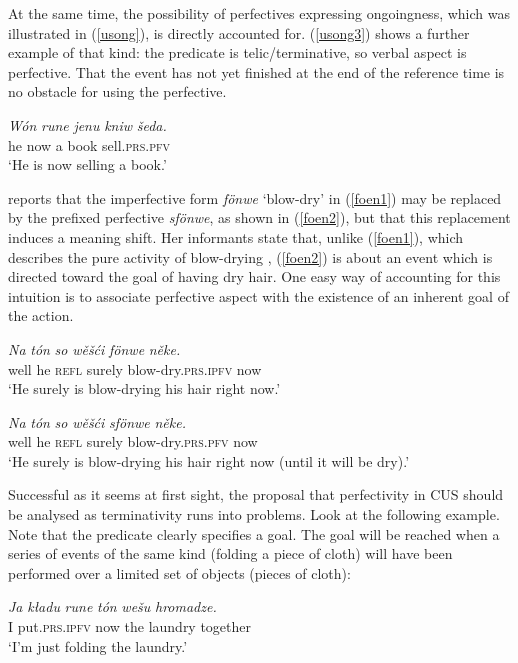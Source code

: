 \documentclass[output=paper,colorlinks,citecolor=brown]{langscibook}
\begin{document}
\noindent At the same time, the possibility of perfectives expressing ongoingness, which was illustrated in (\ref{usong}), is directly accounted for. (\ref{usong3}) shows a further example of that kind: the predicate is telic/terminative, so verbal aspect is perfective. That the event has not yet finished at the end of the reference time is no obstacle for using the perfective.

 \ea\label{usong3}
\gll \textit{W\'on} \textit{rune} \textit{jenu} \textit{kniw} \textit{šeda.} \\
he now a book sell.\textsc{prs.pfv}\\
\glt \normalsize{`He is now selling a book.'}
\z

\noindent \citet[240]{Scholze2008} reports that the imperfective form
\textit{f\"onwe} `blow-dry' in (\ref{foen1}) may be replaced by 
the prefixed perfective \textit{sf\"onwe}, as shown in (\ref{foen2}), but that this replacement induces a meaning shift. Her informants state that, unlike (\ref{foen1}), which describes the pure activity of blow-drying%
, 
(\ref{foen2}) is about an event which is directed toward the goal of having dry hair. One easy way of accounting for this intuition is to associate perfective aspect with the existence of an inherent goal of the action. 

 \ea\label{foen1}
\gll \textit{Na} \textit{t\'on} \textit{so} 
\textit{wěš\'ci} \textit{f\"onwe}
\textit{něke.} \\
well he \textsc{refl} surely blow-dry.\textsc{prs.ipfv}
now\\
\glt \normalsize{`He surely is blow-drying his hair right now.'}
\z

 \ea\label{foen2}
\gll \textit{Na} \textit{t\'on} \textit{so} 
\textit{wěš\'ci} \textit{sf\"onwe}
\textit{něke.} \\
well he \textsc{refl} surely blow-dry.\textsc{prs.pfv}
now\\
\glt \normalsize{`He surely is blow-drying his hair right now (until it will be dry).'}
\z

\noindent Successful as it seems at first sight, the proposal that perfectivity in CUS should be analysed as terminativity runs into problems. 
Look at the following example. Note that the predicate clearly specifies a goal. The goal will be reached when a series of events of the same kind (folding a piece of cloth) will have been performed over a limited set of objects (pieces of cloth):

 \ea\label{sowaesch}
\gll \textit{Ja} \textit{k\l{a}du} \textit{rune} \textit{t\'on} \textit{wešu}
\textit{hromadze.} \\
I put.\textsc{prs.ipfv} now the laundry together\\
\glt \normalsize{`I'm just folding the laundry.'}
\z
\end{document}
